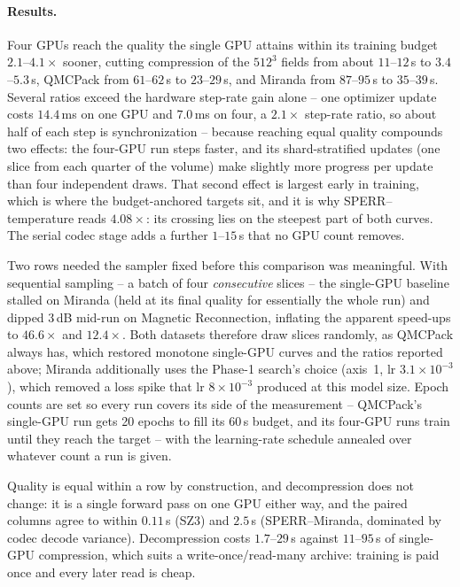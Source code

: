 \paragraph{Results.} Four GPUs reach the quality the single GPU attains
within its training budget $2.1$--$4.1\times$ sooner, cutting compression of
the $512^3$ fields from about $11$--$12$\,s to $3.4$--$5.3$\,s, QMCPack from
$61$--$62$\,s to $23$--$29$\,s, and Miranda from $87$--$95$\,s to
$35$--$39$\,s. Several ratios exceed the hardware step-rate gain alone -- one
optimizer update costs $14.4$\,ms on one GPU and $7.0$\,ms on four, a
$2.1\times$ step-rate ratio, so about half of each step is synchronization --
because reaching equal quality compounds two effects: the four-GPU run steps
faster, and its shard-stratified updates (one slice from each quarter of the
volume) make slightly more progress per update than four independent draws.
That second effect is largest early in training, which is where the
budget-anchored targets sit, and it is why SPERR--temperature reads
$4.08\times$: its crossing lies on the steepest part of both curves. The
serial codec stage adds a further $1$--$15$\,s that no GPU count removes.

Two rows needed the sampler fixed before this comparison was meaningful.
With sequential sampling -- a batch of four \emph{consecutive} slices -- the
single-GPU baseline stalled on Miranda (held at its final quality for
essentially the whole run) and dipped $3$\,dB mid-run on Magnetic
Reconnection, inflating the apparent speed-ups to $46.6\times$ and
$12.4\times$. Both datasets therefore draw slices randomly, as QMCPack always
has, which restored monotone single-GPU curves and the ratios reported above;
Miranda additionally uses the Phase-1 search's choice (axis~1, lr
$3.1\times10^{-3}$), which removed a loss spike that lr $8\times10^{-3}$
produced at this model size. Epoch counts are set so every run covers its
side of the measurement -- QMCPack's single-GPU run gets 20 epochs to fill
its $60$\,s budget, and its four-GPU runs train until they reach the target
-- with the learning-rate schedule annealed over whatever count a run is
given.

Quality is equal within a row by construction, and decompression does not
change: it is a single forward pass on one GPU either way, and the paired
columns agree to within $0.11$\,s (SZ3) and $2.5$\,s (SPERR--Miranda,
dominated by codec decode variance). Decompression costs $1.7$--$29$\,s
against $11$--$95$\,s of single-GPU compression, which suits a
write-once/read-many archive: training is paid once and every later read is
cheap.

